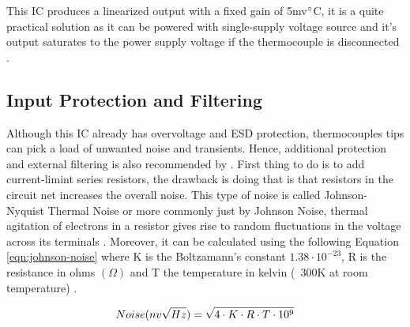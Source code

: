 	This IC produces a linearized output with a fixed gain of 5mv$\/^{\circ}$C, it is a quite practical solution as it can be powered with single-supply voltage source and it's output saturates to the power supply voltage if the thermocouple is disconnected \cite{ad8495-datasheet}.
	
	\subsection{Input Protection and Filtering}\label{ssec:ad8495InputProtectionAndFiltering}
	
	Although this IC already has overvoltage and ESD protection, thermocouples tips can pick a load of unwanted noise and transients. Hence, additional protection and external filtering is also recommended by \cite{two-ways-thermocouple}. First thing to do is to add current-limint series resistors, the drawback is doing that is that resistors in the circuit net increases the overall noise. This type of noise is called Johnson-Nyquist Thermal Noise or more commonly just by Johnson Noise, thermal agitation of electrons in a resistor gives rise to random fluctuations in the voltage across its terminals \cite{romero1998johnson}. Moreover, it can be calculated using the following Equation \ref{eqn:johnson-noise} where K is the Boltzamann's constant $1.38 \cdot 10^{-23}$, R is the resistance in ohms $(\Omega)$ and T the temperature in kelvin (~300K at room temperature) \cite{sensors2000}.
	
		\begin{equation}\label{eqn:johnson-noise}
			Noise (nv\/\sqrt{Hz}) = \sqrt{4 \cdot K \cdot R \cdot T \cdot 10^{9}}
		\end{equation}
		
